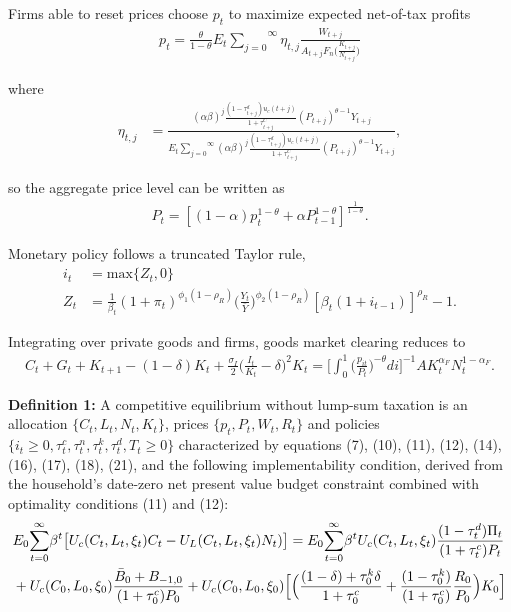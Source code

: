 \documentclass[12pt,letterpaper]{article}
\begin{document}
\noindent Firms able to reset prices choose $p_t$ to maximize expected net-of-tax profits
\begin{align}
p_{t} = \frac{\theta}{1-\theta} E_t \overset{\infty}{\underset{j=0}{\sum}} \eta_{t,j} \frac{W_{t+j}}{A_{t+j} F_n \Big( \frac{K_{t+j}}{N_{t+j}} \big)}
\end{align}

\noindent where
\begin{align}
\eta_{t,j} &= \frac{(\alpha \beta)^j \frac{(1 - \tau^d_{t+j}) u_c (t+j)}{1 + \tau^C_{t+j}} (P_{t+j})^{\theta - 1} Y_{t+j}}{E_t \overset{\infty}{\underset{j=0}{\sum}} (\alpha \beta)^j \frac{(1 - \tau^d_{t+j}) u_c (t+j)}{1 + \tau^C_{t+j}} (P_{t+j})^{\theta - 1} Y_{t+j}},
\end{align}

\noindent so the aggregate price level can be written as
\begin{align}
P_{t} = [(1-\alpha)p_t^{1-\theta} + \alpha P_{t-1}^{1-\theta}]^{\frac{1}{1-\theta}}.
\end{align}

\noindent Monetary policy follows a truncated Taylor rule,
\begin{align}
i_t &= \text{max}\{Z_t, 0\} \\
Z_t &= \frac{1}{\beta_t} (1 + \pi_t)^{\phi_1 (1 - \rho_R)} \big( \frac{Y_t}{\bar{Y}} \big) ^{\phi_2 (1 - \rho_R)} [\beta_t(1 + i_{t-1})]^{\rho_R} - 1.
\end{align}

\noindent Integrating over private goods and firms, goods market clearing reduces to
\begin{align}
C_{t} + G_{t} + K_{t+1} - (1-\delta)K_t +  \frac{\sigma_I}{2} \Big(\frac{I_t}{K_t} - \delta \Big)^2 K_t = \Big[ \int_0^1  \Big( \frac{p_{it}}{P_t} \Big) ^{-\theta} di \Big]^{-1} A K_t ^{\alpha_F} N_t ^{1-\alpha_F}. \end{align}

\noindent \textbf{Definition 1: } A competitive equilibrium without lump-sum taxation is an allocation $\{C_t, L_t, N_t, K_t\}$, prices $\{p_t, P_t, W_t, R_t\}$ and policies $\{i_t \geq 0, \tau_t^c, \tau_t^n, \tau_t^k, \tau_t^d,  T_t \geq 0\}$ characterized by equations (7), (10), (11), (12), (14), (16), (17), (18), (21), and the following implementability condition, derived from the household's date-zero net present value budget constraint combined with optimality conditions (11) and (12): 
\begin{align}
&E_0 \overset{\infty}{\underset{t=0}{\sum}} \beta^t  \big[ U_c (C_t, L_t, \xi_t ) C_t - U_L (C_t, L_t, \xi_t ) N_t)\big] = E_0 \overset{\infty}{\underset{t=0}{\sum}} \beta^t U_c (C_t, L_t, \xi_t ) \frac{(1 - \tau^d_t) \Pi_t}{(1 + \tau_t^c)P_t}  \\ \notag
&+ U_c (C_0, L_0, \xi_0 ) \frac{\bar{B}_0 + B_{-1,0}}{(1 + \tau_0^c) P_0} + U_c (C_0, L_0, \xi_0 ) \Big[ \Big( \frac{(1-\delta) + \tau^k_0 \delta}{1+ \tau_0^c} + \frac{(1-\tau_0^k)}{(1+\tau_0^c)} \frac{R_0}{P_0} \Big) K_0 \Big]
\end{align}
\end{document}
